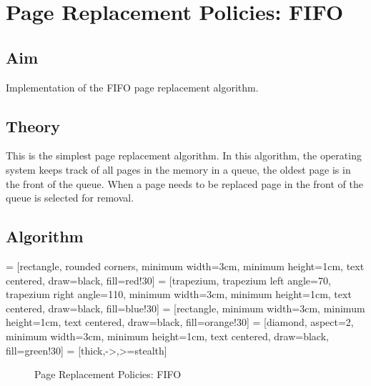 \pagebreak

\section{Page Replacement Policies: FIFO}
\label{sec:page-replacement-fifo}

\subsection{Aim}
Implementation of the FIFO page replacement algorithm.

\subsection{Theory}
This is the simplest page replacement algorithm.
In this algorithm, the operating system keeps track of all pages in the memory in a queue,
the oldest page is in the front of the queue.
When a page needs to be replaced page in the front of
the queue is selected for removal.

\subsection{Algorithm}

 = [rectangle, rounded corners, minimum width=3cm, minimum height=1cm, text centered, draw=black, fill=red!30]
 = [trapezium, trapezium left angle=70, trapezium right angle=110, minimum width=3cm, minimum height=1cm, text centered, draw=black, fill=blue!30]
 = [rectangle, minimum width=3cm, minimum height=1cm, text centered, draw=black, fill=orange!30]
 = [diamond, aspect=2, minimum width=3cm, minimum height=1cm, text centered, draw=black, fill=green!30]
 = [thick,->,>=stealth]

\begin{figure}[h]

  \centering
  \caption{Page Replacement Policies: FIFO}
  \label{fig:page-replacement-fifo}

\end{figure}

